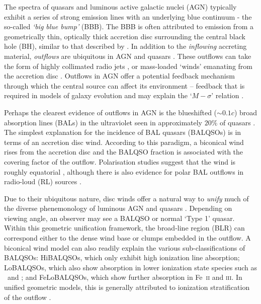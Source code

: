 \documentclass[useAMS,usenatbib]{mn2e_x}
\begin{document}
The spectra of 
quasars and luminous active galactic nuclei (AGN) 
typically exhibit a series of strong emission lines
with an underlying blue continuum - the so-called {\sl `big blue bump'} (BBB). 
The BBB is often attributed to emission from a 
geometrically thin, optically thick accretion disc surrounding the central black hole (BH), similar to that described by \cite{shakurasunyaev1973}.
In addition to the {\em inflowing} accreting material, 
{\em outflows} are ubiquitous in AGN
and quasars \citep{kellerman1989,ganguly2008}. These outflows can take the form of 
highly collimated radio jets \citep[e.g.][]{hazard1963,potash1980,perley1984,marscher2006}, 
or mass-loaded `winds' emanating from the accretion disc 
\citep{weymann1991,turnermiller2009}. 
Outflows in AGN offer a 
potential feedback mechanism through which the central source can 
affect its environment \citep{king2003,king2005,fabian2012}
-- feedback that is required in models of galaxy evolution \citep{springel2005}
and may explain the `$M-\sigma$' relation \citep{silkrees1998,haring2004}.

Perhaps the clearest evidence of outflows in AGN is  
the blueshifted ($\sim 0.1c$) broad absorption lines (BALs) in the 
ultraviolet seen in approximately $20\%$ of quasars
\citep{weymann1991, knigge2008, allen2011}.
The simplest explanation for the incidence of 
BAL quasars (BALQSOs) is in terms of an accretion disc wind. 
According to this paradigm, a biconical wind rises from 
the accretion disc and the BALQSO fraction is associated with
the covering factor of the outflow. 
Polarisation studies suggest that the wind is roughly equatorial
\citep{goodrich1995, cohen1995}, although there is also evidence
for polar BAL outflows  in radio-loud (RL) sources \citep{zhou2006,ghoshpunsly2007}.

Due to their ubiquitous nature,
disc winds offer a natural way to {\em unify} much of the
diverse phenemonology of luminous AGN and quasars \citep[e.g.][]{MCGV95, elvis2000}. 
Depending on viewing angle, an observer 
may see a BALQSO or normal `Type 1' quasar.
Within this geometric unification framework, the broad-line region (BLR) can 
correspond either to the dense wind base or clumps embedded
in the outflow. 
A biconical wind model can also readily explain the various sub-classifications of BALQSOs: 
HiBALQSOs, which only exhibit high ionization line absorption; LoBALQSOs, which also show
absorption in lower ionization state species such as \mg\ and \al; and
FeLoBALQSOs, which show further absorption in Fe~\textsc{ii} and \textsc{iii}.
In unified geometric models, this is generally attributed to ionization stratification
of the outflow \citep[e.g.][]{elvis2000}.
\end{document}
